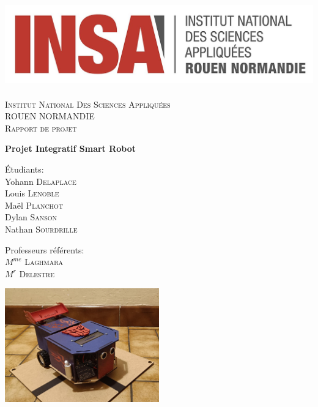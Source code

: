 \documentclass[a4paper, 11pt]{report}
\begin{document}
\begin{titlepage}

    \centering
    \includegraphics[scale=0.3]{imagesRapport/logoInsaRouen.jpg}~\\[0.1cm]
    \textsc{\LARGE Institut National Des Sciences Appliquées}\\[0.1cm]
    \textsc{\LARGE ROUEN NORMANDIE}\\[0.5cm]
    \textsc{\Large Rapport de projet}\\[0.5cm]
    
    {\huge\bfseries Projet Integratif Smart Robot \par}
    \vspace{0.5cm}
   
    Étudiants:\\
    Yohann \textsc{Delaplace}\\
    Louis \textsc{Lenoble}\\
    Maël \textsc{Planchot}\\
    Dylan \textsc{Sanson}\\
    Nathan \textsc{Sourdrille}\\
    \vspace{0.5cm}
    
    Professeurs référents:\\
    $M^{me}$ \textsc{Laghmara}\\
    $M^{r}$ \textsc{Delestre}
    
    \vspace{2cm}
   
    \includegraphics[width=0.5\textwidth]{imagesRapport/photoRobot.jpeg}\par

\end{titlepage}
\end{document}
